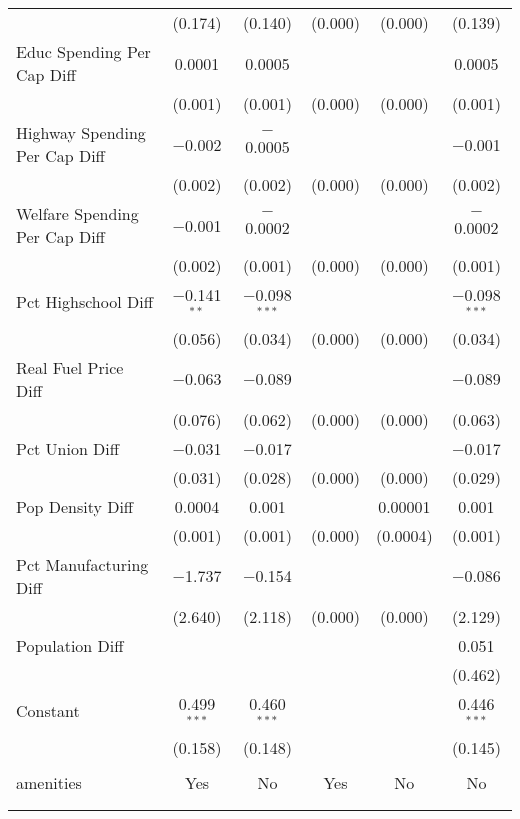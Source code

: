 \begin{table}[!htbp]
\begin{tabular}{@{\extracolsep{5pt}}lccccc}
  & (0.174) & (0.140) & (0.000) & (0.000) & (0.139) \\ 
  Educ Spending Per Cap Diff & 0.0001 & 0.0005 &  &  & 0.0005 \\ 
  & (0.001) & (0.001) & (0.000) & (0.000) & (0.001) \\ 
  Highway Spending Per Cap Diff & $-$0.002 & $-$0.0005 &  &  & $-$0.001 \\ 
  & (0.002) & (0.002) & (0.000) & (0.000) & (0.002) \\ 
  Welfare Spending Per Cap Diff & $-$0.001 & $-$0.0002 &  &  & $-$0.0002 \\ 
  & (0.002) & (0.001) & (0.000) & (0.000) & (0.001) \\ 
  Pct Highschool Diff & $-$0.141$^{**}$ & $-$0.098$^{***}$ &  &  & $-$0.098$^{***}$ \\ 
  & (0.056) & (0.034) & (0.000) & (0.000) & (0.034) \\ 
  Real Fuel Price Diff & $-$0.063 & $-$0.089 &  &  & $-$0.089 \\ 
  & (0.076) & (0.062) & (0.000) & (0.000) & (0.063) \\ 
  Pct Union Diff & $-$0.031 & $-$0.017 &  &  & $-$0.017 \\ 
  & (0.031) & (0.028) & (0.000) & (0.000) & (0.029) \\ 
  Pop Density Diff & 0.0004 & 0.001 &  & 0.00001 & 0.001 \\ 
  & (0.001) & (0.001) & (0.000) & (0.0004) & (0.001) \\ 
  Pct Manufacturing Diff & $-$1.737 & $-$0.154 &  &  & $-$0.086 \\ 
  & (2.640) & (2.118) & (0.000) & (0.000) & (2.129) \\ 
  Population Diff &  &  &  &  & 0.051 \\ 
  &  &  &  &  & (0.462) \\ 
  Constant & 0.499$^{***}$ & 0.460$^{***}$ &  &  & 0.446$^{***}$ \\ 
  & (0.158) & (0.148) &  &  & (0.145) \\ 
 \hline \\[-1.8ex] 
amenities & Yes & No & Yes & No & No \\ 
\hline \\[-1.8ex] 
\hline 
\hline \\[-1.8ex] 
\end{tabular} 
\end{table} 
